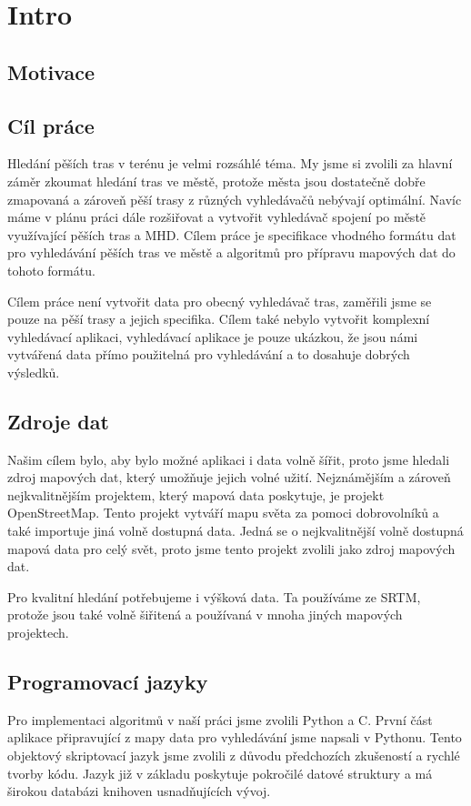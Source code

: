 \chapter{Intro}

\section{Motivace}

\section{Cíl práce}
Hledání pěších tras v terénu je velmi rozsáhlé téma. My jsme si zvolili za
hlavní záměr zkoumat hledání tras ve městě, protože města jsou dostatečně dobře
zmapovaná a zároveň pěší trasy z různých vyhledávačů nebývají optimální. Navíc
máme v plánu práci dále rozšiřovat a vytvořit vyhledávač spojení po městě
využívající pěších tras a MHD.
Cílem práce je specifikace vhodného formátu dat pro vyhledávání pěších tras ve
městě a algoritmů pro přípravu mapových dat do tohoto formátu. 

Cílem práce není vytvořit data pro obecný vyhledávač tras, zaměřili jsme se
pouze na pěší trasy a jejich specifika. Cílem také nebylo vytvořit komplexní
vyhledávací aplikaci, vyhledávací aplikace je pouze ukázkou, že jsou námi
vytvářená data přímo použitelná pro vyhledávání a to dosahuje dobrých výsledků.

\section{Zdroje dat}
Našim cílem bylo, aby bylo možné aplikaci i data volně šířit, proto jsme hledali
zdroj mapových dat, který umožňuje jejich volné užití. Nejznámějším a zároveň
nejkvalitnějším projektem, který mapová data poskytuje, je projekt
OpenStreetMap. Tento projekt vytváří mapu světa za pomoci dobrovolníků a také
importuje jiná volně dostupná data. Jedná se o nejkvalitnější volně dostupná
mapová data pro celý svět, proto jsme tento projekt zvolili jako zdroj mapových
dat.

Pro kvalitní hledání potřebujeme i výšková data. Ta používáme ze SRTM, protože
jsou také volně šiřitená a používaná v mnoha jiných mapových projektech.


\section{Programovací jazyky}
Pro implementaci algoritmů v naší práci jsme zvolili Python a C. První část
aplikace připravující z mapy data pro vyhledávání jsme napsali v Pythonu. Tento
objektový skriptovací jazyk jsme zvolili z důvodu předchozích zkušeností a
rychlé tvorby kódu. Jazyk již v základu poskytuje pokročilé datové struktury a
má širokou databázi knihoven usnadňujících vývoj. 

